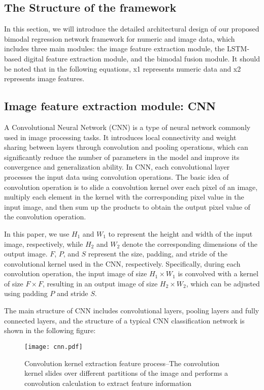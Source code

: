 \documentclass{ecai}
\begin{document}
\subsection{The Structure of the framework}
In this section, we will introduce the detailed architectural design of our proposed bimodal regression network framework for numeric and image data, which includes three main modules: the image feature extraction module, the LSTM-based digital feature extraction module, and the bimodal fusion module. It should be noted that in the following equations, x1 represents numeric data and x2 represents image features.

\subsection{Image feature extraction module: CNN}
A Convolutional Neural Network (CNN) \cite{lecun1998gradient} is a type of neural network commonly used in image processing tasks. It introduces local connectivity and weight sharing between layers through convolution and pooling operations, which can significantly reduce the number of parameters in the model and improve its convergence and generalization ability. In CNN, each convolutional layer processes the input data using convolution operations. The basic idea of convolution operation is to slide a convolution kernel over each pixel of an image, multiply each element in the kernel with the corresponding pixel value in the input image, and then sum up the products to obtain the output pixel value of the convolution operation.

In this paper, we use $H_1$ and $W_1$ to represent the height and width of the input image, respectively, while $H_2$ and $W_2$ denote the corresponding dimensions of the output image. $F$, $P$, and $S$ represent the size, padding, and stride of the convolutional kernel used in the CNN, respectively. Specifically, during each convolution operation, the input image of size $H_1 \times W_1$ is convolved with a kernel of size $F \times F$, resulting in an output image of size $H_2 \times W_2$, which can be adjusted using padding $P$ and stride $S$.






 The main structure of CNN includes convolutional layers, pooling layers and fully connected layers, and the structure of a typical CNN classification network is shown in the following figure:
 
\begin{figure}
\centering
\texttt{[image: cnn.pdf]}
\caption{Convolution kernel extraction feature process--The convolution kernel slides over different partitions of the image and performs a convolution calculation to extract feature information}
\end{figure}
\end{document}
